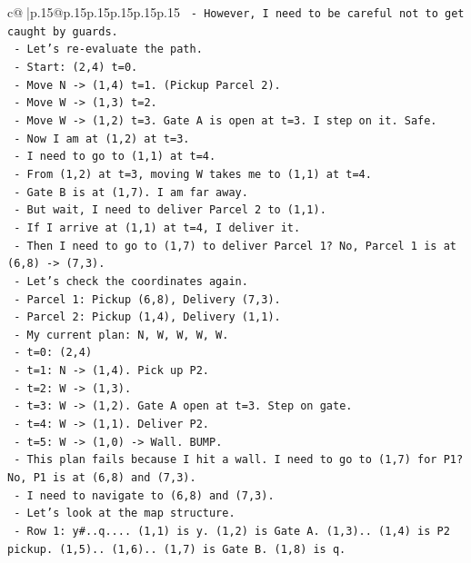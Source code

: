 \documentclass{article}
\begin{document}
{\begin{supertabular}{c@{$\;$}|p{.15\linewidth}@{}p{.15\linewidth}p{.15\linewidth}p{.15\linewidth}p{.15\linewidth}p{.15\linewidth}}
{{{\texttt{   {-} However, I need to be careful not to get caught by guards.} \\
\texttt{   {-} Let's re{-}evaluate the path.} \\
\texttt{   {-} Start: (2,4) t=0.} \\
\texttt{   {-} Move N {-}> (1,4) t=1. (Pickup Parcel 2).} \\
\texttt{   {-} Move W {-}> (1,3) t=2.} \\
\texttt{   {-} Move W {-}> (1,2) t=3. Gate A is open at t=3. I step on it. Safe.} \\
\texttt{   {-} Now I am at (1,2) at t=3.} \\
\texttt{   {-} I need to go to (1,1) at t=4.} \\
\texttt{   {-} From (1,2) at t=3, moving W takes me to (1,1) at t=4.} \\
\texttt{   {-} Gate B is at (1,7). I am far away.} \\
\texttt{   {-} But wait, I need to deliver Parcel 2 to (1,1).} \\
\texttt{   {-} If I arrive at (1,1) at t=4, I deliver it.} \\
\texttt{   {-} Then I need to go to (1,7) to deliver Parcel 1? No, Parcel 1 is at (6,8) {-}> (7,3).} \\
\texttt{   {-} Let's check the coordinates again.} \\
\texttt{   {-} Parcel 1: Pickup (6,8), Delivery (7,3).} \\
\texttt{   {-} Parcel 2: Pickup (1,4), Delivery (1,1).} \\
\texttt{   {-} My current plan: N, W, W, W, W.} \\
\texttt{   {-} t=0: (2,4)} \\
\texttt{   {-} t=1: N {-}> (1,4). Pick up P2.} \\
\texttt{   {-} t=2: W {-}> (1,3).} \\
\texttt{   {-} t=3: W {-}> (1,2). Gate A open at t=3. Step on gate.} \\
\texttt{   {-} t=4: W {-}> (1,1). Deliver P2.} \\
\texttt{   {-} t=5: W {-}> (1,0) {-}> Wall. BUMP.} \\
\texttt{   {-} This plan fails because I hit a wall. I need to go to (1,7) for P1? No, P1 is at (6,8) and (7,3).} \\
\texttt{   {-} I need to navigate to (6,8) and (7,3).} \\
\texttt{   {-} Let's look at the map structure.} \\
\texttt{   {-} Row 1: y\#..q.... (1,1) is y. (1,2) is Gate A. (1,3).. (1,4) is P2 pickup. (1,5).. (1,6).. (1,7) is Gate B. (1,8) is q.} \\
}}}
\end{supertabular}}
\end{document}

